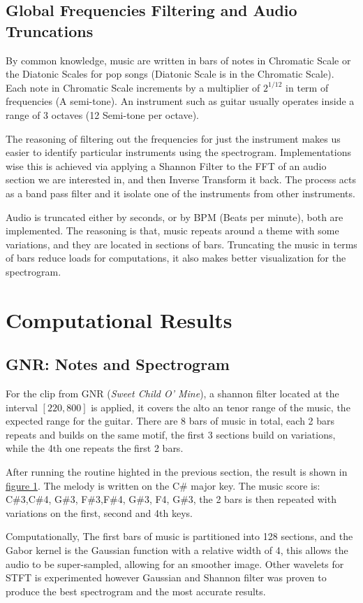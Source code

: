 \documentclass{article}
\begin{document}
    \subsection{Global Frequencies Filtering and Audio Truncations}
        \par\hspace{1.1em}
        By common knowledge, music are written in bars of notes in Chromatic Scale or the Diatonic Scales for pop songs (Diatonic Scale is in the Chromatic Scale). Each note in Chromatic Scale increments by a multiplier of $2^{1/12}$ in term of frequencies (A semi-tone). An instrument such as guitar usually operates inside a range of 3 octaves (12 Semi-tone per octave). 
        \par
        The reasoning of filtering out the frequencies for just the instrument makes us easier to identify particular instruments using the spectrogram. Implementations wise this is achieved via applying a Shannon Filter to the FFT of an audio section we are interested in, and then Inverse Transform it back. The process acts as a band pass filter and it isolate one of the instruments from other instruments. 
        \par
        Audio is truncated either by seconds, or by BPM (Beats per minute), both are implemented. The reasoning is that, music repeats around a theme with some variations, and they are located in sections of bars. Truncating the music in terms of bars reduce loads for computations, it also makes better visualization for the spectrogram. 

\section{Computational Results}
    \subsection{GNR: Notes and Spectrogram}
        \par\hspace{1.1em}
        For the clip from GNR (\textit{Sweet Child O' Mine}), a shannon filter located at the interval $[220, 800]$ is applied, it covers the alto an tenor range of the music, the expected range for the guitar.
        There are 8 bars of music in total, each 2 bars repeats and builds on the same motif, the first 3 sections build on variations, while the 4th one repeats the first 2 bars. 
        \par
        After running the routine highted in the previous section, the result is shown in \hyperref[fig:1]{figure 1}. The melody is written on the C\# major key. The music score is: C\#3,C\#4, G\#3, F\#3,F\#4, G\#3, F4, G\#3, the 2 bars is then repeated with variations on the first, second and 4th keys.   
        \par
        Computationally, The first bars of music is partitioned into 128 sections, and the Gabor kernel is the Gaussian function with a relative width of 4, this allows the audio to be super-sampled, allowing for an smoother image. Other wavelets for STFT is experimented however Gaussian and Shannon filter was proven to produce the best spectrogram and the most accurate results. 
\end{document}

